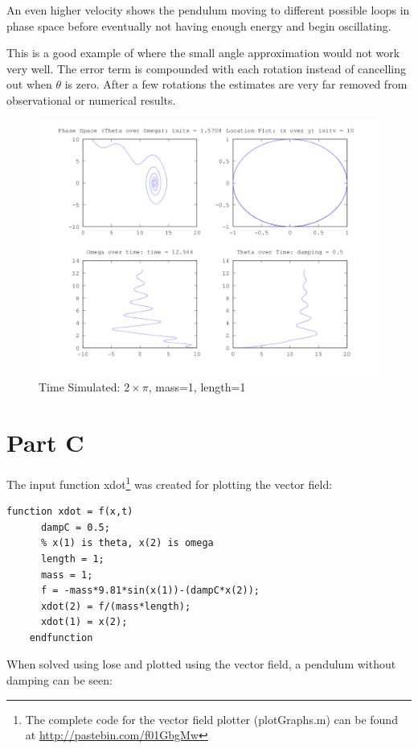 \documentclass{article}
\begin{document}
An even higher velocity shows the pendulum moving to different possible loops in phase space before eventually not having enough energy and begin oscillating.

This is a good example of where the small angle approximation would not work very well. The error term is compounded with each rotation instead of cancelling out when $\theta$ is zero. After a few rotations the estimates are very far removed from observational or numerical results.

\begin{figure}[H]
\caption{Time Simulated: $2\times\pi$, mass=1, length=1}
\includegraphics[width=\textwidth]{plot5}
\end{figure}

\newpage
\section{Part C}
The input function xdot\footnote{The complete code for the vector field plotter (plotGraphs.m) can be found at \url{http://pastebin.com/f01GbgMw}} was created for plotting the vector field: 
\begin{lstlisting}
function xdot = f(x,t)
      dampC = 0.5;
      % x(1) is theta, x(2) is omega
      length = 1;
      mass = 1;
      f = -mass*9.81*sin(x(1))-(dampC*x(2));
      xdot(2) = f/(mass*length);
      xdot(1) = x(2);
    endfunction
\end{lstlisting}

When solved using lose and plotted using the vector field, a pendulum without damping can be seen:
\end{document}
